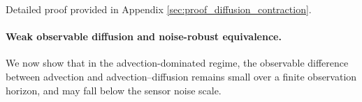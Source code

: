 Detailed proof provided in Appendix \ref{sec:proof_diffusion_contraction}.

\paragraph{Weak observable diffusion and noise-robust equivalence.}
We now show that in the advection-dominated regime, the observable difference between advection and advection--diffusion remains small over a finite observation horizon, and may fall below the sensor noise scale.




